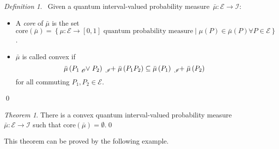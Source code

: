 \documentclass{article}
\theoremstyle{remark}
\newtheorem{definition}{Definition}
\newtheorem{thm}{Theorem}
\newcommand{\events}{\ensuremath{\mathcal{E}}}
\begin{document}
\begin{definition}~Given a quantum interval-valued probability measure~$\bar{\mu}:\events\rightarrow\mathscr{I}$:
\begin{itemize}
\item A \emph{core} of $\bar{\mu}$ is the set $\mathrm{core}\left(\bar{\mu}\right)=\left\{ \mu:\events\rightarrow[0,1]\textrm{ quantum probability measure}\middle|\mu\left(P\right)\in\bar{\mu}\left(P\right)\forall P\in\events\right\} $.
\item $\bar{\mu}$ is called convex if 
\begin{equation}
\bar{\mu}\left(P_{1}\tensor*[_{\mathscr{O}}]{\vee}{}P_{2}\right)\tensor*[_{\mathscr{I}}]{+}{}\bar{\mu}\left(P_{1}P_{2}\right)\subseteq\bar{\mu}\left(P_{1}\right)\tensor*[_{\mathscr{I}}]{+}{}\bar{\mu}\left(P_{2}\right)\label{eq:QuantumInterval-valuedProbability-Convex}
\end{equation}
 for all commuting $P_{1},P_{2}\in\events$. 
\end{itemize}
\qed\end{definition}

\begin{thm}\label{def:EmptyCoreQuantumInterval-valuedProbability}
There is a convex quantum interval-valued probability measure~$\bar{\mu}:\events\rightarrow\mathscr{I}$
such that $\mathrm{core}\left(\bar{\mu}\right)=\emptyset$.\qed\end{thm}

This theorem can be proved by the following example. 
\end{document}
